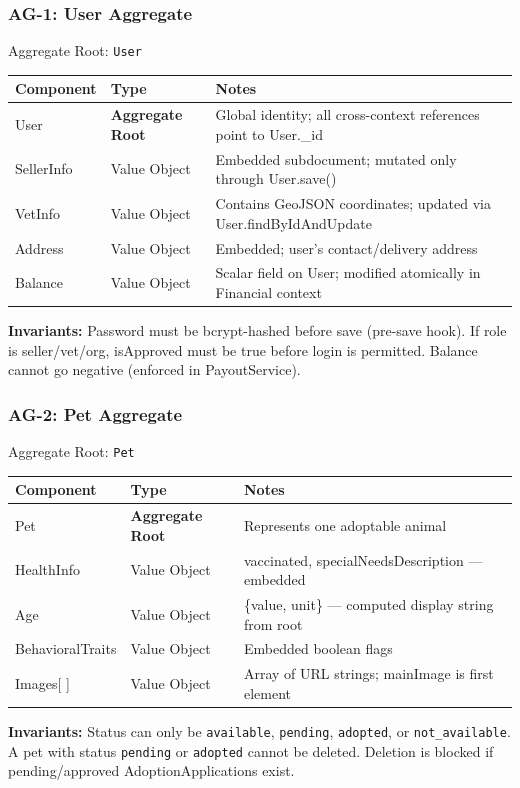\documentclass[12pt,a4paper]{article}
\begin{document}
\subsubsection{AG-1: User Aggregate}

\begin{infobox}{Aggregate Root: \texttt{User}}
\begin{tabular}{@{}p{3cm}p{2.8cm}p{7.8cm}@{}}
\textbf{Component} & \textbf{Type} & \textbf{Notes} \\
\hline
User & \textbf{Aggregate Root} & Global identity; all cross-context references point to User.\_id \\
SellerInfo & Value Object & Embedded subdocument; mutated only through User.save() \\
VetInfo & Value Object & Contains GeoJSON coordinates; updated via User.findByIdAndUpdate \\
Address & Value Object & Embedded; user's contact/delivery address \\
Balance & Value Object & Scalar field on User; modified atomically in Financial context \\
\end{tabular}

\textbf{Invariants:} Password must be bcrypt-hashed before save (pre-save hook). If role is seller/vet/org, isApproved must be true before login is permitted. Balance cannot go negative (enforced in PayoutService).
\end{infobox}

\subsubsection{AG-2: Pet Aggregate}

\begin{infobox}{Aggregate Root: \texttt{Pet}}
\begin{tabular}{@{}p{3cm}p{2.8cm}p{7.8cm}@{}}
\textbf{Component} & \textbf{Type} & \textbf{Notes} \\
\hline
Pet & \textbf{Aggregate Root} & Represents one adoptable animal \\
HealthInfo & Value Object & vaccinated, specialNeedsDescription — embedded \\
Age & Value Object & \{value, unit\} — computed display string from root \\
BehavioralTraits & Value Object & Embedded boolean flags \\
Images[ ] & Value Object & Array of URL strings; mainImage is first element \\
\end{tabular}

\textbf{Invariants:} Status can only be \texttt{available}, \texttt{pending}, \texttt{adopted}, or \texttt{not\_available}. A pet with status \texttt{pending} or \texttt{adopted} cannot be deleted. Deletion is blocked if pending/approved AdoptionApplications exist.
\end{infobox}
\end{document}
